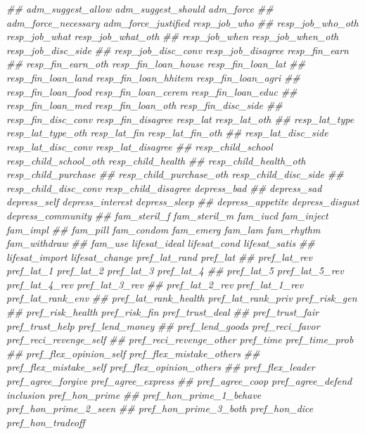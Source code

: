 \documentclass[
]{article}
\newenvironment{Shaded}{\begin{snugshade}}{\end{snugshade}}
\newcommand{\CommentTok}[1]{\textcolor[rgb]{0.56,0.35,0.01}{\textit{#1}}}
\begin{document}
\begin{Shaded}
\begin{Highlighting}[]
\CommentTok{##      adm_suggest_allow adm_suggest_should adm_force}
\CommentTok{##      adm_force_necessary adm_force_justified resp_job_who}
\CommentTok{##      resp_job_who_oth resp_job_what resp_job_what_oth}
\CommentTok{##      resp_job_when resp_job_when_oth resp_job_disc_side}
\CommentTok{##      resp_job_disc_conv resp_job_disagree resp_fin_earn}
\CommentTok{##      resp_fin_earn_oth resp_fin_loan_house resp_fin_loan_lat}
\CommentTok{##      resp_fin_loan_land resp_fin_loan_hhitem resp_fin_loan_agri}
\CommentTok{##      resp_fin_loan_food resp_fin_loan_cerem resp_fin_loan_educ}
\CommentTok{##      resp_fin_loan_med resp_fin_loan_oth resp_fin_disc_side}
\CommentTok{##      resp_fin_disc_conv resp_fin_disagree resp_lat resp_lat_oth}
\CommentTok{##      resp_lat_type resp_lat_type_oth resp_lat_fin resp_lat_fin_oth}
\CommentTok{##      resp_lat_disc_side resp_lat_disc_conv resp_lat_disagree}
\CommentTok{##      resp_child_school resp_child_school_oth resp_child_health}
\CommentTok{##      resp_child_health_oth resp_child_purchase}
\CommentTok{##      resp_child_purchase_oth resp_child_disc_side}
\CommentTok{##      resp_child_disc_conv resp_child_disagree depress_bad}
\CommentTok{##      depress_sad depress_self depress_interest depress_sleep}
\CommentTok{##      depress_appetite depress_disgust depress_community}
\CommentTok{##      fam_steril_f fam_steril_m fam_iucd fam_inject fam_impl}
\CommentTok{##      fam_pill fam_condom fam_emerg fam_lam fam_rhythm fam_withdraw}
\CommentTok{##      fam_use lifesat_ideal lifesat_cond lifesat_satis}
\CommentTok{##      lifesat_import lifesat_change pref_lat_rand pref_lat}
\CommentTok{##      pref_lat_rev pref_lat_1 pref_lat_2 pref_lat_3 pref_lat_4}
\CommentTok{##      pref_lat_5 pref_lat_5_rev pref_lat_4_rev pref_lat_3_rev}
\CommentTok{##      pref_lat_2_rev pref_lat_1_rev pref_lat_rank_env}
\CommentTok{##      pref_lat_rank_health pref_lat_rank_priv pref_risk_gen}
\CommentTok{##      pref_risk_health pref_risk_fin pref_trust_deal}
\CommentTok{##      pref_trust_fair pref_trust_help pref_lend_money}
\CommentTok{##      pref_lend_goods pref_reci_favor pref_reci_revenge_self}
\CommentTok{##      pref_reci_revenge_other pref_time pref_time_prob}
\CommentTok{##      pref_flex_opinion_self pref_flex_mistake_others}
\CommentTok{##      pref_flex_mistake_self pref_flex_opinion_others}
\CommentTok{##      pref_flex_leader pref_agree_forgive pref_agree_express}
\CommentTok{##      pref_agree_coop pref_agree_defend inclusion pref_hon_prime}
\CommentTok{##      pref_hon_prime_1_behave pref_hon_prime_2_seen}
\CommentTok{##      pref_hon_prime_3_both pref_hon_dice pref_hon_tradeoff}

\end{Highlighting}
\end{Shaded}
\end{document}

